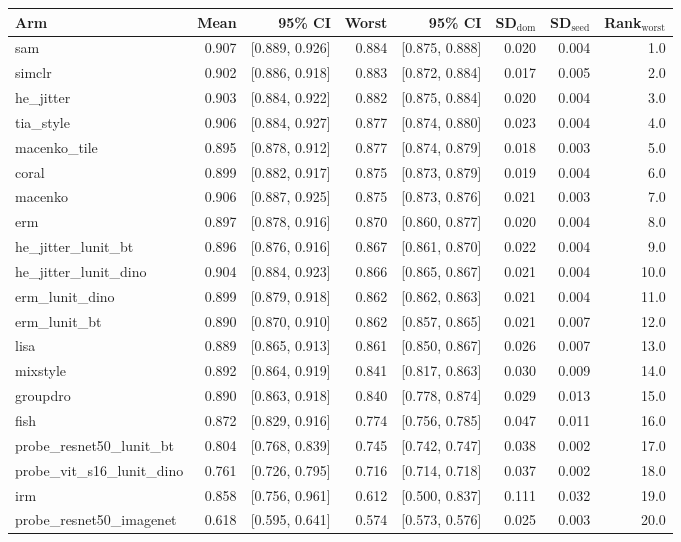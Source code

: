 \begin{tabular}{lrrrrrrr}
\toprule
Arm & Mean & 95\% CI & Worst & 95\% CI & SD$_\text{dom}$ & SD$_\text{seed}$ & Rank$_\text{worst}$ \\
\midrule
sam & 0.907 & [0.889, 0.926] & 0.884 & [0.875, 0.888] & 0.020 & 0.004 & 1.0 \\
simclr & 0.902 & [0.886, 0.918] & 0.883 & [0.872, 0.884] & 0.017 & 0.005 & 2.0 \\
he\_jitter & 0.903 & [0.884, 0.922] & 0.882 & [0.875, 0.884] & 0.020 & 0.004 & 3.0 \\
tia\_style & 0.906 & [0.884, 0.927] & 0.877 & [0.874, 0.880] & 0.023 & 0.004 & 4.0 \\
macenko\_tile & 0.895 & [0.878, 0.912] & 0.877 & [0.874, 0.879] & 0.018 & 0.003 & 5.0 \\
coral & 0.899 & [0.882, 0.917] & 0.875 & [0.873, 0.879] & 0.019 & 0.004 & 6.0 \\
macenko & 0.906 & [0.887, 0.925] & 0.875 & [0.873, 0.876] & 0.021 & 0.003 & 7.0 \\
erm & 0.897 & [0.878, 0.916] & 0.870 & [0.860, 0.877] & 0.020 & 0.004 & 8.0 \\
he\_jitter\_lunit\_bt & 0.896 & [0.876, 0.916] & 0.867 & [0.861, 0.870] & 0.022 & 0.004 & 9.0 \\
he\_jitter\_lunit\_dino & 0.904 & [0.884, 0.923] & 0.866 & [0.865, 0.867] & 0.021 & 0.004 & 10.0 \\
erm\_lunit\_dino & 0.899 & [0.879, 0.918] & 0.862 & [0.862, 0.863] & 0.021 & 0.004 & 11.0 \\
erm\_lunit\_bt & 0.890 & [0.870, 0.910] & 0.862 & [0.857, 0.865] & 0.021 & 0.007 & 12.0 \\
lisa & 0.889 & [0.865, 0.913] & 0.861 & [0.850, 0.867] & 0.026 & 0.007 & 13.0 \\
mixstyle & 0.892 & [0.864, 0.919] & 0.841 & [0.817, 0.863] & 0.030 & 0.009 & 14.0 \\
groupdro & 0.890 & [0.863, 0.918] & 0.840 & [0.778, 0.874] & 0.029 & 0.013 & 15.0 \\
fish & 0.872 & [0.829, 0.916] & 0.774 & [0.756, 0.785] & 0.047 & 0.011 & 16.0 \\
probe\_resnet50\_lunit\_bt & 0.804 & [0.768, 0.839] & 0.745 & [0.742, 0.747] & 0.038 & 0.002 & 17.0 \\
probe\_vit\_s16\_lunit\_dino & 0.761 & [0.726, 0.795] & 0.716 & [0.714, 0.718] & 0.037 & 0.002 & 18.0 \\
irm & 0.858 & [0.756, 0.961] & 0.612 & [0.500, 0.837] & 0.111 & 0.032 & 19.0 \\
probe\_resnet50\_imagenet & 0.618 & [0.595, 0.641] & 0.574 & [0.573, 0.576] & 0.025 & 0.003 & 20.0 \\
\bottomrule
\end{tabular}
